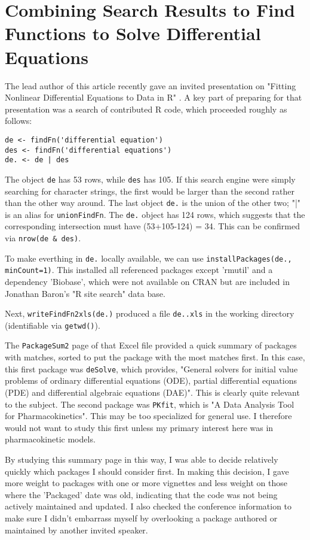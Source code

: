 \section*{Combining Search Results to Find Functions to Solve Differential Equations}

The lead author of this article recently gave an invited presentation
on "Fitting Nonlinear Differential Equations to Data in R" \citep{GHR09}.
A key part of preparing for that presentation was a search
of contributed R code, which proceeded roughly as follows:

\begin{verbatim}
de <- findFn('differential equation')
des <- findFn('differential equations')
de. <- de | des
\end{verbatim}

The object {\tt de} has 53 rows, while {\tt des} has 105.
If this search engine were simply searching for character
strings, the first would be larger than the second rather than
the other way around.  The last object {\tt de.} is the union
of the other two;  "|" is an alias for {\tt unionFindFn}.
The {\tt de.} object has 124 rows, which suggests that
the corresponding intersection must have (53+105-124) = 34.  
This can be confirmed via {\tt nrow(de \& des)}.

To make everthing in {\tt de.} locally available, we can use
{\tt installPackages(de., minCount=1)}.  This installed all
referenced packages except 'rmutil' and a dependency 'Biobase',
which were not available on CRAN but are included in Jonathan
Baron's "R site search" data base.

Next, {\tt writeFindFn2xls(de.)} produced a file {\tt de..xls}
in the working directory (identifiable via {\tt getwd()}).

The {\tt PackageSum2} page of that Excel file provided a quick
summary of packages with matches, sorted to put the package
with the most matches first.  In this case, this first package
was {\tt deSolve}, which provides, "General solvers for initial
value problems of ordinary differential equations (ODE),
partial differential equations (PDE) and differential
algebraic equations (DAE)".  This is clearly quite relevant
to the subject.  The second package was {\tt PKfit}, which
is "A Data Analysis Tool for Pharmacokinetics".  This may
be too specialized for general use.  I therefore would not
want to study this first unless my primary interest here was in
pharmacokinetic models.

By studying this summary page in this way, I was able to decide
relatively quickly which packages I should consider first.  In
making this decision, I gave more weight to packages with
one or more vignettes and less weight on those where the
'Packaged' date was old, indicating that the code was not being
actively maintained and updated.  I also checked the conference
information to make sure I didn't embarrass myself by overlooking
a package authored or maintained by another invited speaker.

